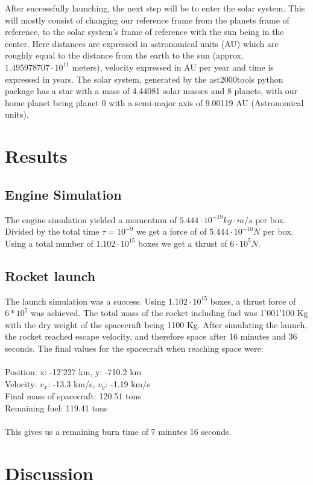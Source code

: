 \documentclass[reprint,english,notitlepage]{revtex4-2}
\begin{document}
After successfully launching, the next step will be to enter the solar system.
This will mostly consist of changing our reference frame from the planets frame of reference, to the solar system's frame of reference with the sun being in the center.
Here distances are expressed in astronomical units (AU) which are roughly equal to the distance from the earth to the sun (approx. $1.495978707 \cdot 10^{11}$ meters), velocity expressed in AU per year and time is expressed in years.
The solar system, generated by the ast2000tools python package has a star with a mass of 4.44081 solar masses and 8 planets, with our home planet being planet 0 with a semi-major axis of 9.00119 AU (Astronomical units).

\section{Results}
	\subsection{Engine Simulation}
	The engine simulation yielded a momentum of $ 5.444 \cdot 10^{-19}kg \cdot  m / s $ per box.
	Divided by the total time $ \tau = 10^{-9}$ we get a force of of $5.444 \cdot 10^{-10}N $ per box.
	Using a total number of $ 1.102 \cdot  10^{15}$ boxes we get a thrust of $ 6 \cdot  10^{5} N $.

	\subsection{Rocket launch}
	The launch simulation was a success.
	Using $1.102 \cdot  10^{15}$ boxes, a thrust force of $6*10^5$ was achieved.
	The total mass of the rocket including fuel was 1'001'100 Kg with the dry weight of the spacecraft being 1100 Kg.
	After simulating the launch, the rocket reached escape velocity, and therefore space after 16 minutes and 36 seconds.
	The final values for the spacecraft when reaching space were:\\\\
	Position: x: -12'227 km, y: -710.2 km\\
	Velocity: $v_x$: -13.3 km/s, $v_y$: -1.19 km/s\\
	Final mass of spacecraft: 120.51 tons\\
	Remaining fuel: 119.41 tons\\\\
	This gives us a remaining burn time of 7 minutes 16 seconds.


\section{Discussion}
\end{document}
